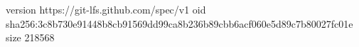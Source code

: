 version https://git-lfs.github.com/spec/v1
oid sha256:3c8b730e91448b8cb91569dd99ca8b236b89cbb6acf060e5d89c7b80027fc01e
size 218568
